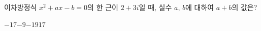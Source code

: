 이차방정식 $x^2+ax-b=0$의 한 근이 $2+3i$일 때, 실수 $a$, $b$에 대하여 $a+b$의 값은?
\begin{choices32}{$-17$}{$-9$}{$-1$}{$9$}{$17$}\end{choices32}
